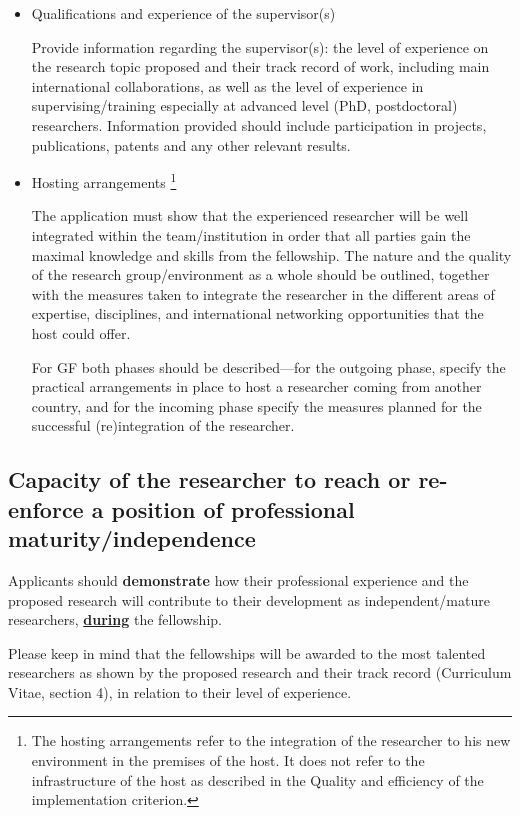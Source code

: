 \begin{itemize}
  \item Qualifications and experience of the supervisor(s)

Provide information regarding the supervisor(s): 
the level of experience on the research topic proposed and their track record of work, 
including main international collaborations, 
as well as the level of experience in supervising/training especially at advanced level (PhD, postdoctoral) researchers.
Information provided should include participation in projects, publications, patents and any other relevant results.

  \item Hosting arrangements%
\footnote{The hosting arrangements refer to the integration of the researcher to his new environment in the premises of the host. 
It does not refer to the infrastructure of the host as described in the Quality and efficiency of the implementation criterion.}

The application must show that the experienced researcher will be well integrated within the team/institution in order that all parties gain the maximal knowledge and skills from the fellowship.
The nature and the quality of the research group/environment as a whole should be outlined, 
together with the measures taken to integrate the researcher in the different areas of expertise, disciplines, and international networking opportunities that the host could offer.

For GF both phases should be described\----for the outgoing phase, specify the practical arrangements in place to host a researcher coming from another country, 
and for the incoming phase specify the measures planned for the successful (re)integration of the researcher.
\end{itemize}




\subsection{Capacity of the researcher to reach or re-enforce a position of professional maturity/independence}
\label{sec:excellence_maturity}

Applicants should \textbf{demonstrate} how their professional experience and the proposed
research will contribute to their development as independent/mature researchers, \ul{\textbf{during}}
the fellowship.

\medskip\noindent
Please keep in mind that the fellowships will be awarded to the most talented researchers
as shown by the proposed research and their track record (Curriculum Vitae, section 4),
in relation to their level of experience.

